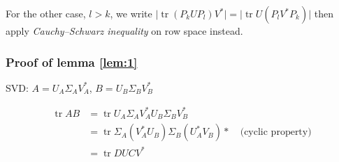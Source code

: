 \documentclass{article}
\DeclareMathOperator{\tr}{tr}
\begin{document}
For the other case, $l > k$, we write $\big|\tr (P_k U P_l) V^*\big| = \big|\tr U (P_l V^* P_k)\big|$ then apply \emph{Cauchy–Schwarz inequality} on row space instead.

\subsubsection{Proof of lemma \ref{lem:1}}

SVD: $A = U_A \Sigma_A V_A^*$, $B = U_B \Sigma_B V_B^*$

\begin{equation}
\begin{split}
    \tr AB  &= \tr U_A \Sigma_A V_A^* U_B \Sigma_B V_B^* \\
            &= \tr \Sigma_A (V_A^* U_B) \Sigma_B (U_A^* V_B)* \quad \text{(cyclic property)} \\ 
            &= \tr D U C V^* \\
\end{split}
\end{equation}



\end{document}
